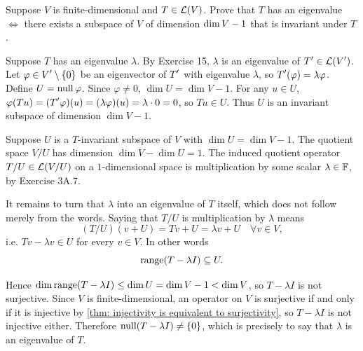 \begin{xrcs}
  Suppose $V$ is finite-dimensional and $T \in \mathcal{L}(V)$. Prove that $T$ has an eigenvalue $\iff$ there exists a subspace of $V$ of dimension $\operatorname{dim} V - 1$ that is invariant under $T$.

  \begin{xprf}
    \Rightarrowdirection Suppose $T$ has an eigenvalue $\lambda$. By Exercise 15, $\lambda$ is an eigenvalue of $\displaystyle T' \in \mathcal{L}(\displaystyle V')$.
    Let $\varphi \in \displaystyle V' \setminus \{0\}$ be an eigenvector of $\displaystyle T'$ with eigenvalue $\lambda$, so $\displaystyle T'(\varphi) = \lambda \varphi$.
    Define $U = \operatorname{null} \varphi$. Since $\varphi \neq 0$, $\dim U = \dim V - 1$.
    For any $u \in U$, $\varphi(Tu) = (\displaystyle T'\varphi)(u) = (\lambda \varphi)(u) = \lambda \cdot 0 = 0$, so $Tu \in U$.
    Thus $U$ is an invariant subspace of dimension $\dim V - 1$.

    \Leftarrowdirection Suppose $U$ is a $T$-invariant subspace of $V$ with $\dim U = \dim V - 1$.
    The quotient space $V/U$ has dimension $\dim V - \dim U = 1$.
    The induced quotient operator $T/U \in \mathcal{L}(V/U)$ on a $1$-dimensional space is multiplication by some scalar $\lambda \in \mathbb{F}$, by Exercise 3A.7.

    It remains to turn that $\lambda$ into an eigenvalue of $T$ itself, which does not follow merely from the words. Saying that $T/U$ is multiplication by $\lambda$ means
    \begin{equation}
      (T/U)(v + U) = Tv + U = \lambda v + U \quad \forall v \in V,
    \end{equation}
    i.e. $Tv - \lambda v \in U$ for every $v \in V$. In other words
    \begin{equation}
      \operatorname{range} (T - \lambda I) \subseteq U.
    \end{equation}

    Hence $\dim \operatorname{range} (T-\lambda I) \leq \dim U = \dim V - 1 < \dim V$, so $T - \lambda I$ is not surjective. Since $V$ is finite-dimensional, an operator on $V$ is surjective if and only if it is injective by \ref{thm: injectivity is equivalent to surjectivity}, so $T - \lambda I$ is not injective either. Therefore $\operatorname{null} (T - \lambda I) \neq \{0\}$, which is precisely to say that $\lambda$ is an eigenvalue of $T$.
  \end{xprf}
\end{xrcs}

